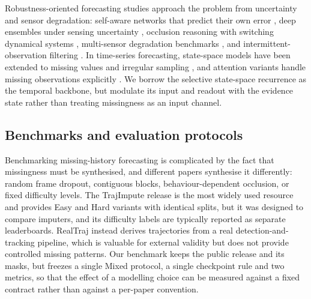 Robustness-oriented forecasting studies approach the problem from uncertainty and sensor degradation: self-aware networks that predict their own error \cite{itkina2022interpretable}, deep ensembles under sensing uncertainty \cite{nayak2023deepensembles}, occlusion reasoning with switching dynamical systems \cite{wei2024navigation}, multi-sensor degradation benchmarks \cite{mohta2021multisensor,sanchez2023robustness}, and intermittent-observation filtering \cite{sinopoli2004kalman}. In time-series forecasting, state-space models have been extended to missing values and irregular sampling \cite{gu2022efficient,peng2025s4m,yalavarthi2025profit}, and attention variants handle missing observations explicitly \cite{gao2021gradient,becker2021missformer}. We borrow the selective state-space recurrence \cite{gu2023mamba} as the temporal backbone, but modulate its input and readout with the evidence state rather than treating missingness as an input channel.

\subsection{Benchmarks and evaluation protocols}
Benchmarking missing-history forecasting is complicated by the fact that missingness must be synthesised, and different papers synthesise it differently: random frame dropout, contiguous blocks, behaviour-dependent occlusion, or fixed difficulty levels. The TrajImpute release \cite{chib2024pedestrian} is the most widely used resource and provides Easy and Hard variants with identical splits, but it was designed to compare imputers, and its difficulty labels are typically reported as separate leaderboards. RealTraj \cite{fujii2024realtraj} instead derives trajectories from a real detection-and-tracking pipeline, which is valuable for external validity but does not provide controlled missing patterns. Our benchmark keeps the public release and its masks, but freezes a single Mixed protocol, a single checkpoint rule and two metrics, so that the effect of a modelling choice can be measured against a fixed contract rather than against a per-paper convention.
